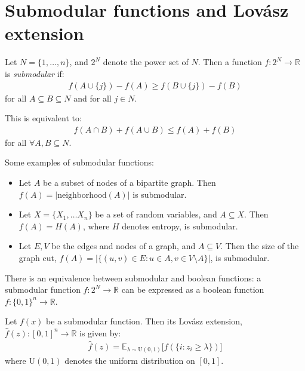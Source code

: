 %
%
%
%
%
%	
%	
\section{Submodular functions and Lov\'{a}sz extension}

\begin{definition}
	Let $N = \{1, \dots, n\}$, and $2^N$ denote the power set of $N$.
	Then a function $f : 2^N \rightarrow \mathbb{R}$ is \emph{submodular} if:
	\begin{align*}
	f(A \cup \{ j \} ) - f(A) \geq f(B \cup \{ j \}) - f(B)
	\end{align*}
	for all $A \subseteq B \subseteq N$ and for all $j \in N$.
	
	This is equivalent to:
	\begin{align*}
	f(A \cap B) + f(A \cup B) \leq f(A) + f(B)
	\end{align*}
	for all $\forall A, B \subseteq N$.
	
\end{definition}

Some examples of submodular functions:
\begin{itemize}
	\item Let $A$ be a subset of nodes of a bipartite graph. Then $f(A) = | \text{neighborhood}(A) |$ is submodular.
	
	\item Let $X = \{ X_1, \dots X_n \}$ be a set of random variables, and $A \subseteq X$. Then $f(A) = H(A)$, where $H$ denotes entropy, is submodular.
	
	\item Let $E, V$ be the edges and nodes of a graph, and $A \subseteq V$. Then the size of the graph cut, $f(A) = \big| \{ (u, v) \in E : u \in A, v \in V \setminus A \} \big| $, is submodular.
\end{itemize}

There is an equivalence between submodular and boolean functions: a submodular function $f: 2^N \rightarrow \mathbb{R}$ can be expressed as a boolean function $f: \{0, 1\}^n \rightarrow \mathbb{R}$.

\begin{definition}
Let $f(x)$ be a submodular function. Then its Lov\'{a}sz extension, $\hat f(z): [0, 1]^n \rightarrow \mathbb{R}$ is given by:
\begin{align*}
\hat f(z) = \mathbb{E}_{\lambda \sim \text{U}(0, 1)} \bigg[ f(\{i : z_i \geq \lambda \}) \bigg]
\end{align*}
where $\text{U}(0, 1)$ denotes the uniform distribution on $[0, 1]$.
\end{definition}

